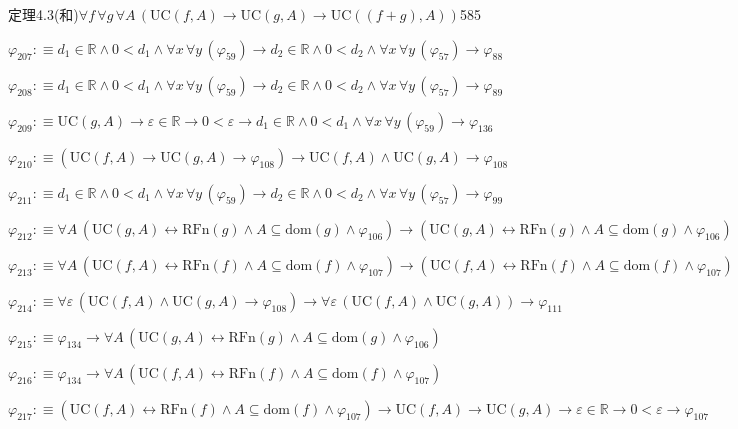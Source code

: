 \begin{fullproof}{定理4.3(和)}{$\forall f\,\forall g\,\forall A\,(\mathrm{UC}(f,A) \to \mathrm{UC}(g,A) \to \mathrm{UC}((f + g),A))$}{585}
\begin{abbrevlist}
\item $\varphi_{207} :\equiv d_{1} \in \mathbb{R} \land 0 < d_{1} \land \forall x\,\forall y\,(\varphi_{59}) \to d_{2} \in \mathbb{R} \land 0 < d_{2} \land \forall x\,\forall y\,(\varphi_{57}) \to \varphi_{88}$
\item $\varphi_{208} :\equiv d_{1} \in \mathbb{R} \land 0 < d_{1} \land \forall x\,\forall y\,(\varphi_{59}) \to d_{2} \in \mathbb{R} \land 0 < d_{2} \land \forall x\,\forall y\,(\varphi_{57}) \to \varphi_{89}$
\item $\varphi_{209} :\equiv \mathrm{UC}(g,A) \to \varepsilon \in \mathbb{R} \to 0 < \varepsilon \to d_{1} \in \mathbb{R} \land 0 < d_{1} \land \forall x\,\forall y\,(\varphi_{59}) \to \varphi_{136}$
\item $\varphi_{210} :\equiv (\mathrm{UC}(f,A) \to \mathrm{UC}(g,A) \to \varphi_{108}) \to \mathrm{UC}(f,A) \land \mathrm{UC}(g,A) \to \varphi_{108}$
\item $\varphi_{211} :\equiv d_{1} \in \mathbb{R} \land 0 < d_{1} \land \forall x\,\forall y\,(\varphi_{59}) \to d_{2} \in \mathbb{R} \land 0 < d_{2} \land \forall x\,\forall y\,(\varphi_{57}) \to \varphi_{99}$
\item $\varphi_{212} :\equiv \forall A\,(\mathrm{UC}(g,A) \leftrightarrow \mathrm{RFn}(g) \land A \subseteq \mathrm{dom}(g) \land \varphi_{106}) \to (\mathrm{UC}(g,A) \leftrightarrow \mathrm{RFn}(g) \land A \subseteq \mathrm{dom}(g) \land \varphi_{106})$
\item $\varphi_{213} :\equiv \forall A\,(\mathrm{UC}(f,A) \leftrightarrow \mathrm{RFn}(f) \land A \subseteq \mathrm{dom}(f) \land \varphi_{107}) \to (\mathrm{UC}(f,A) \leftrightarrow \mathrm{RFn}(f) \land A \subseteq \mathrm{dom}(f) \land \varphi_{107})$
\item $\varphi_{214} :\equiv \forall \varepsilon\,(\mathrm{UC}(f,A) \land \mathrm{UC}(g,A) \to \varphi_{108}) \to \forall \varepsilon\,(\mathrm{UC}(f,A) \land \mathrm{UC}(g,A)) \to \varphi_{111}$
\item $\varphi_{215} :\equiv \varphi_{134} \to \forall A\,(\mathrm{UC}(g,A) \leftrightarrow \mathrm{RFn}(g) \land A \subseteq \mathrm{dom}(g) \land \varphi_{106})$
\item $\varphi_{216} :\equiv \varphi_{134} \to \forall A\,(\mathrm{UC}(f,A) \leftrightarrow \mathrm{RFn}(f) \land A \subseteq \mathrm{dom}(f) \land \varphi_{107})$
\item $\varphi_{217} :\equiv (\mathrm{UC}(f,A) \leftrightarrow \mathrm{RFn}(f) \land A \subseteq \mathrm{dom}(f) \land \varphi_{107}) \to \mathrm{UC}(f,A) \to \mathrm{UC}(g,A) \to \varepsilon \in \mathbb{R} \to 0 < \varepsilon \to \varphi_{107}$

\end{abbrevlist}
\end{fullproof}
